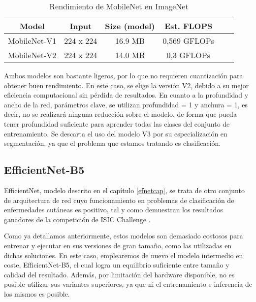 \begin{table}[!ht]
	\centering
	\begin{tabular}{|c|c|c|c|c|c|}
		\hline
		\textbf{Model} & \textbf{Input} & \textbf{Size (model)} & \textbf{Est. FLOPS}  \\ \hline
		MobileNet-V1 & 224 x 224 & 16.9 MB & 0,569 GFLOPs \\ \hline
		MobileNet-V2 & 224 x 224 & 14.0 MB & 0,3 GFLOPs	  \\ \hline
	\end{tabular}
		\caption{Rendimiento de MobileNet en ImageNet \cite{mobilespecs}}
\end{table}

Ambos modelos son bastante ligeros, por lo que no requieren cuantización para obtener buen rendimiento. En este caso, se elige la versión V2, debido a su mejor eficiencia computacional sin pérdida de resultados. En cuanto a la profundidad y ancho de la red, parámetros clave, se utilizan profundidad = 1 y anchura = 1, es decir, no se realizará ninguna reducción sobre el modelo, de forma que pueda tener profundidad suficiente para aprender todas las clases del conjunto de entrenamiento. Se descarta el uso del modelo V3 por su especialización en segmentación, ya que el problema que estamos tratando es clasificación.

\subsection{EfficientNet-B5}

EfficientNet, modelo descrito en el capítulo \ref{efnetcap},  se trata de otro conjunto de arquitectura de red cuyo funcionamiento en problemas de clasificación de enfermedades cutáneas es positivo, tal y como demuestran los resultados ganadores de la competición de ISIC Challenge \cite{1stISIC, 2ndISIC}.

Como ya detallamos anteriormente, estos modelos son demasiado costosos para entrenar y ejecutar en sus versiones de gran tamaño, como las utilizadas en dichas soluciones. En este caso, emplearemos de nuevo el modelo intermedio en coste, EfficientNet-B5, el cual logra un equilibrio suficiente entre tamaño y calidad del resultado. Además, por limitación del hardware disponible, no es posible utilizar sus variantes superiores, ya que ni el entrenamiento e inferencia de los mismos es posible.

